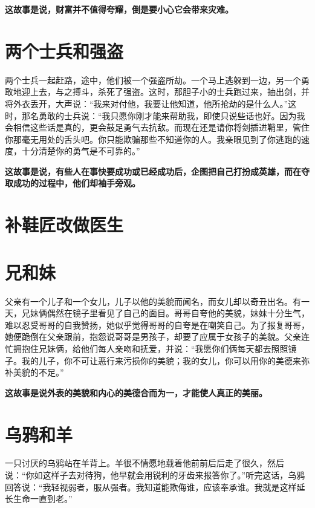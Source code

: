 {\bfseries \color{red}这故事是说，财富并不值得夸耀，倒是要小心它会带来灾难。}

\section{两个士兵和强盗}

两个士兵一起赶路，途中，他们被一个强盗所劫。一个马上逃躲到一边，另一个勇敢地迎上去，与之搏斗，杀死了强盗。这时，那胆子小的士兵跑过来，抽出剑，并将外衣丢开，大声说：“我来对付他，我要让他知道，他所抢劫的是什么人。”这时，那名勇敢的士兵说：“我只愿你刚才能来帮助我，即使只说些话也好。因为我会相信这些话是真的，更会鼓足勇气去抗敌。而现在还是请你将剑插进鞘里，管住你那毫无用处的舌头吧。你只能欺骗那些不知道你的人。我亲眼见到了你逃跑的速度，十分清楚你的勇气是不可靠的。”

{\bfseries \color{red}这故事是说，有些人在事快要成功或已经成功后，企图把自己打扮成英雄，而在夺取成功的过程中，他们却袖手旁观。}

\section{补鞋匠改做医生}



{\bfseries \color{red}}

\section{兄和妹}

父亲有一个儿子和一个女儿，儿子以他的美貌而闻名，而女儿却以奇丑出名。有一天，兄妹俩偶然在镜子里看见了自己的面目。哥哥自夸他的美貌，妹妹十分生气，难以忍受哥哥的自我赞扬，她似乎觉得哥哥的自夸是在嘲笑自己。为了报复哥哥，她便跪倒在父亲跟前，抱怨说哥哥是男孩子，却要了应属于女孩子的美貌。父亲连忙拥抱住兄妹俩，给他们每人亲吻和抚爱，并说：“我愿你们俩每天都去照照镜子。我的儿子，你不可让恶行来污损你的美貌；我的女儿，你可以用你的美德来弥补美貌的不足。”

{\bfseries \color{red}这故事是说外表的美貌和内心的美德合而为一，才能使人真正的美丽。}

\section{乌鸦和羊}

一只讨厌的乌鸦站在羊背上。羊很不情愿地载着他前前后后走了很久，然后说：“你如这样子去对待狗，他早就会用锐利的牙齿来报答你了。”听完这话，乌鸦回答说：“我轻视弱者，服从强者。我知道能欺侮谁，应该奉承谁。我就是这样延长生命一直到老。”

